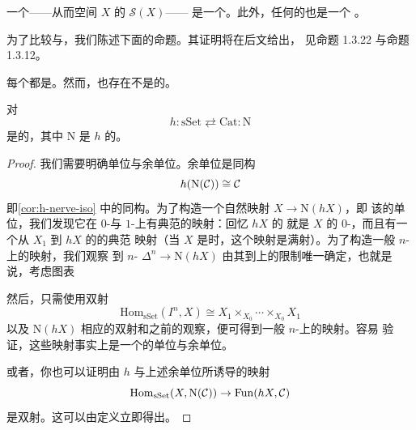 \begin{example*}
一个\trKanComplex{}——从而空间 $X$ 的\trSingularSimplicialSet{} $\mathcal{S}(X)$——
是一个\trInfinityCategory{}。此外，任何\trCategory{}的\trNerve{}也是一个%
\trInfinityCategory{}。
\end{example*}

为了比较\trInfinityCategories{}与\trComposer{}，我们陈述下面的命题。其证明将在后文给出，
见命题 1.3.22 与命题 1.3.12。

\begin{proposition}\label{prop:infinity-category-composer}
每个\trInfinityCategory{}都是\trComposer{}。然而，也存在不是\trInfinityCategories{}的\trComposer{}。
\end{proposition}

\begin{proposition}\label{prop:h-n-adjoint}
\trFunctor{}对
\[
h\colon \mathrm{sSet} \rightleftarrows \mathrm{Cat} : \mathrm{N}
\]
是\trAdjunction{}的，其中 $\mathrm{N}$ 是 $h$ 的\trRightAdjoint{}。
\end{proposition}

\begin{proof}
我们需要明确单位与余单位\trNaturalTransformation{}。余单位是同构
\[
h(\mathrm{N}(\mathcal{C})) \cong \mathcal{C}
\]
即\cref{cor:h-nerve-iso} 中的同构。为了构造一个自然映射 $X \to \mathrm{N}(hX)$，即
该\trAdjunction{}的单位，我们发现它在 $0$-\trSimplex{}与 $1$-\trSimplex{}上有典范的映射：回忆 $hX$ 的%
\trObject{}就是 $X$ 的 $0$-\trSimplex{}，而且有一个从 $X_1$ 到 $hX$ 的\trMorphism{}的典范
映射（当 $X$ 是\trComposer{}时，这个映射是满射）。为了构造一般 $n$-\trSimplex{}上的映射，我们观察
到 $n$-\trSimplex{} $\Delta^n \to \mathrm{N}(hX)$ 由其到\trSpine{}上的限制唯一确定，也就是
说，考虑图表
\begin{center}
\end{center}
然后，只需使用双射
\[
\mathrm{Hom}_{\mathrm{sSet}}(I^n, X) \cong X_1 \times_{X_0} \dotsb \times_{X_0} X_1
\]
以及 $\mathrm{N}(hX)$ 相应的双射和之前的观察，便可得到一般 $n$-\trSimplex{}上的映射。容易
验证，这些映射事实上是一个\trAdjunction{}的单位与余单位。

或者，你也可以证明由 $h$ 与上述余单位所诱导的映射
\[
\mathrm{Hom}_{\mathrm{sSet}}(X, \mathrm{N}(\mathcal{C})) \to \mathrm{Fun}(hX, \mathcal{C})
\]
是双射。这可以由定义立即得出。
\end{proof}

